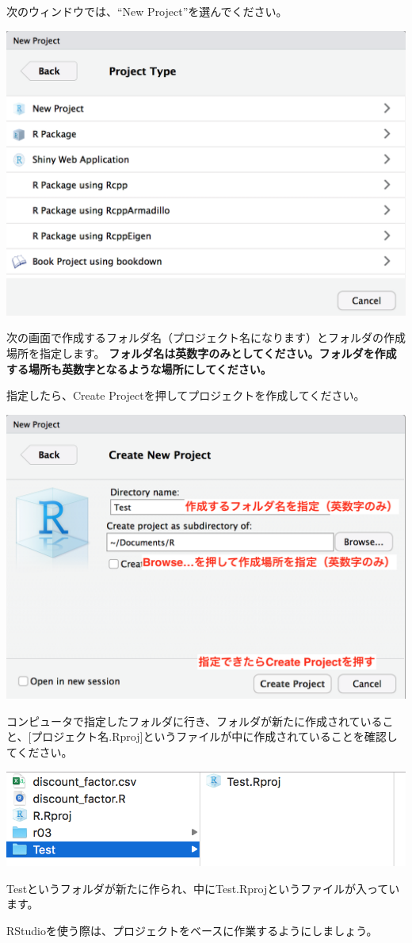 \documentclass[
]{book}
\begin{document}
次のウィンドウでは、``New Project''を選んでください。

\begin{center}\includegraphics[width=0.5\linewidth]{image/project3} \end{center}

次の画面で作成するフォルダ名（プロジェクト名になります）とフォルダの作成場所を指定します。
\textbf{フォルダ名は英数字のみとしてください。フォルダを作成する場所も英数字となるような場所にしてください。}

指定したら、Create Projectを押してプロジェクトを作成してください。

\begin{center}\includegraphics[width=0.5\linewidth]{image/project4} \end{center}

コンピュータで指定したフォルダに行き、フォルダが新たに作成されていること、{[}プロジェクト名.Rproj{]}というファイルが中に作成されていることを確認してください。

\begin{center}\includegraphics[width=0.5\linewidth]{image/project5} \end{center}

Testというフォルダが新たに作られ、中にTest.Rprojというファイルが入っています。

RStudioを使う際は、プロジェクトをベースに作業するようにしましょう。
\end{document}

